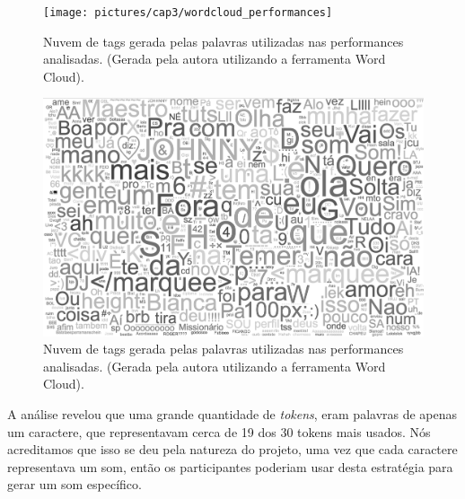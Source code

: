 
\begin{figure}[ht!]
\centering
\texttt{[image: pictures/cap3/wordcloud\_performances]}
\caption{Nuvem de tags gerada pelas palavras utilizadas nas performances analisadas. (Gerada pela autora utilizando a ferramenta Word Cloud).}
\label{fig:clouds}
\end{figure}

\begin{figure}[ht!]
\centering
\includegraphics[width=1\linewidth]{pictures/cap3/wordcloud_pb}
\caption{Nuvem de tags gerada pelas palavras utilizadas nas performances analisadas. (Gerada pela autora utilizando a ferramenta Word Cloud).}
\label{fig:cloud}
\end{figure}

A análise revelou que uma grande quantidade de \emph{tokens}, eram palavras de apenas um caractere, que representavam cerca de 19 dos 30 tokens mais usados. Nós acreditamos que isso se deu pela natureza do projeto, uma vez que cada caractere representava um som, então os participantes poderiam usar desta estratégia para gerar um som específico. 

